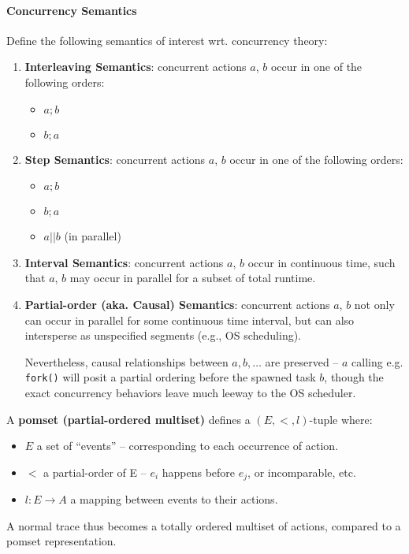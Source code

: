\documentclass[99-notes-packed.tex]{subfiles}
\begin{document}
\paragraph*{Concurrency Semantics} Define the following semantics of interest wrt. concurrency theory: 
\begin{enumerate}
    \item {
        \textbf{Interleaving Semantics}: concurrent actions $a$, $b$ occur in one of the following orders: 
        \begin{itemize}
            \item $a; b$
            \item $b; a$
        \end{itemize}
    }
    \item {
        \textbf{Step Semantics}: concurrent actions $a$, $b$ occur in one of the following orders: 
        \begin{itemize}
            \item $a; b$
            \item $b; a$
            \item $a || b$ (in parallel)
        \end{itemize}
    }
    \item {
        \textbf{Interval Semantics}: concurrent actions $a$, $b$ occur in continuous time, such that $a$, $b$ may occur in parallel for a subset of total runtime. 
    }
    \item {
        \textbf{Partial-order (aka. Causal) Semantics}: concurrent actions $a$, $b$ not only can occur in parallel for some continuous time interval, but can also intersperse as unspecified segments (e.g., OS scheduling). 

        Nevertheless, causal relationships between $a, b, \dots$ are preserved -- $a$ calling e.g. \texttt{fork()} will posit a partial ordering before the spawned task $b$, though the exact concurrency behaviors leave much leeway to the OS scheduler.
    }
\end{enumerate}

\begin{definition}[Pomset]
    A \textbf{pomset (partial-ordered multiset)} defines a $(E, <, l)$-tuple where:
    \begin{itemize}
        \item $E$ a set of ``events'' -- corresponding to each occurrence of action. 
        \item $<$ a partial-order of E -- $e_i$ happens before $e_j$, or incomparable, etc.
        \item $l: E \rightarrow A$ a mapping between events to their actions. 
    \end{itemize}

    A normal trace thus becomes a totally ordered multiset of actions, compared to a pomset representation. 
\end{definition}
\end{document}
